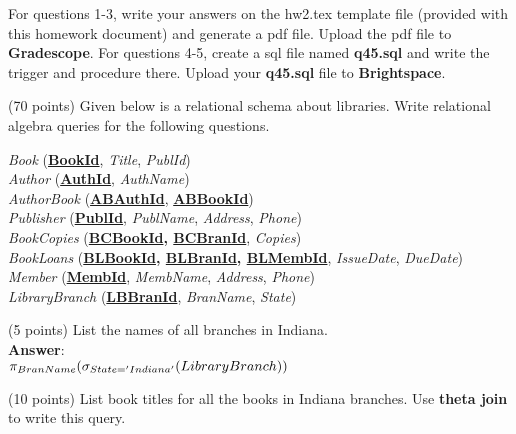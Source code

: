 For questions 1-3, write your answers on the hw2.tex template file (provided with this homework document) and generate a pdf file. Upload the pdf file to \textbf{Gradescope}. For questions 4-5, create a sql file named \textbf{q45.sql} and write the trigger and procedure there. Upload your \textbf{q45.sql} file to \textbf{Brightspace}.\\

\begin{questions}

\question (70 points) Given below is a relational schema about libraries. Write relational algebra queries for the following questions.\\

\begin{addmargin}[1em]{2em}%

    \textit{Book} (\textbf{\underline{BookId}},  \textit{Title}, \textit{PublId})\\
    \textit{Author} (\textbf{\underline{AuthId}}, \textit{AuthName})\\
    \textit{AuthorBook} (\textbf{\underline{ABAuthId}}, \textbf{\underline{ABBookId}})\\
    \textit{Publisher} (\textbf{\underline{PublId}}, \textit{PublName}, \textit{Address}, \textit{Phone})\\
    \textit{BookCopies} (\textbf{\underline{BCBookId}, \underline{BCBranId}}, \textit{Copies})\\
    \textit{BookLoans} (\textbf{\underline{BLBookId}, \underline{BLBranId}, \underline{BLMembId}}, \textit{IssueDate}, \textit{DueDate})\\
    \textit{Member} (\textbf{\underline{MembId}},  \textit{MembName}, \textit{Address}, \textit{Phone})\\
    \textit{LibraryBranch} (\textbf{\underline{LBBranId}}, \textit{BranName}, \textit{State})\\
    
\end{addmargin}

\begin{choices}

	\choice(5 points) List the names of all branches in Indiana.\\
	\textbf{Answer}:\\
    $\pi_{BranName}(\sigma_{State='Indiana' } (LibraryBranch) )$
	
	\choice(10 points) List book titles for all the books in Indiana branches. Use \textbf{theta join} to write this query. 
	

\end{choices}
\end{questions}
